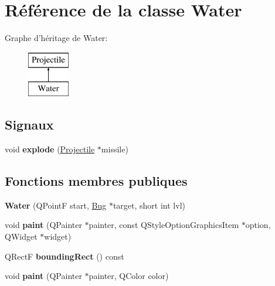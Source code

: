 \hypertarget{classWater}{
\section{Référence de la classe Water}
\label{classWater}
}
Graphe d'héritage de Water:\begin{figure}[H]
\begin{center}
\leavevmode
\includegraphics[height=2.000000cm]{classWater}
\end{center}
\end{figure}
\subsection*{Signaux}
\begin{DoxyCompactItemize}
\item 
\hypertarget{classProjectile_a18d1fccd74f92b54f239c13c74cbc00c}{
void {\bfseries explode} (\hyperlink{classProjectile}{Projectile} $\ast$missile)}
\label{classProjectile_a18d1fccd74f92b54f239c13c74cbc00c}

\end{DoxyCompactItemize}
\subsection*{Fonctions membres publiques}
\begin{DoxyCompactItemize}
\item 
\hypertarget{classWater_aee3bec8d65112f496fec8d8cb18cd9af}{
{\bfseries Water} (QPointF start, \hyperlink{classBug}{Bug} $\ast$target, short int lvl)}
\label{classWater_aee3bec8d65112f496fec8d8cb18cd9af}

\item 
\hypertarget{classWater_a1f8777c164bb06a357a78cabd9e790a2}{
void {\bfseries paint} (QPainter $\ast$painter, const QStyleOptionGraphicsItem $\ast$option, QWidget $\ast$widget)}
\label{classWater_a1f8777c164bb06a357a78cabd9e790a2}

\item 
\hypertarget{classProjectile_a0e0b18909c9c154404384707c6515802}{
QRectF {\bfseries boundingRect} () const }
\label{classProjectile_a0e0b18909c9c154404384707c6515802}

\item 
\hypertarget{classProjectile_aef0d6ffcea7620988cf5446d0c1133fa}{
void {\bfseries paint} (QPainter $\ast$painter, QColor color)}
\label{classProjectile_aef0d6ffcea7620988cf5446d0c1133fa}

\end{DoxyCompactItemize}
